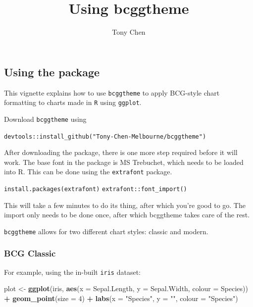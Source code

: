 \documentclass[
]{article}
\title{Using bcggtheme}
\author{Tony Chen}
\date{}
\newenvironment{Shaded}{\begin{snugshade}}{\end{snugshade}}
\newcommand{\DataTypeTok}[1]{\textcolor[rgb]{0.13,0.29,0.53}{#1}}
\newcommand{\DecValTok}[1]{\textcolor[rgb]{0.00,0.00,0.81}{#1}}
\newcommand{\KeywordTok}[1]{\textcolor[rgb]{0.13,0.29,0.53}{\textbf{#1}}}
\newcommand{\NormalTok}[1]{#1}
\newcommand{\OperatorTok}[1]{\textcolor[rgb]{0.81,0.36,0.00}{\textbf{#1}}}
\newcommand{\StringTok}[1]{\textcolor[rgb]{0.31,0.60,0.02}{#1}}
\begin{document}
\maketitle

\hypertarget{using-the-package}{%
\subsection{Using the package}\label{using-the-package}}

This vignette explains how to use \texttt{bcggtheme} to apply BCG-style
chart formatting to charts made in \texttt{R} using \texttt{ggplot}.

Download \texttt{bcggtheme} using

\texttt{devtools::install\_github("Tony-Chen-Melbourne/bcggtheme")}

After downloading the package, there is one more step required before it
will work. The base font in the package is MS Trebuchet, which needs to
be loaded into R. This can be done using the \texttt{extrafont} package.

\texttt{install.packages(extrafont)} \texttt{extrafont::font\_import()}

This will take a few minutes to do its thing, after which you're good to
go. The import only needs to be done once, after which bcggtheme takes
care of the rest.

\texttt{bcggtheme} allows for two different chart styles: classic and
modern.

\hypertarget{bcg-classic}{%
\subsubsection{BCG Classic}\label{bcg-classic}}

For example, using the in-built \texttt{iris} dataset:

\begin{Shaded}
\begin{Highlighting}[]
\NormalTok{plot <-}\StringTok{ }\KeywordTok{ggplot}\NormalTok{(iris,}
               \KeywordTok{aes}\NormalTok{(}\DataTypeTok{x =}\NormalTok{ Sepal.Length,}
                   \DataTypeTok{y =}\NormalTok{ Sepal.Width,}
                   \DataTypeTok{colour =}\NormalTok{ Species)) }\OperatorTok{+}
\StringTok{        }\KeywordTok{geom_point}\NormalTok{(}\DataTypeTok{size =} \DecValTok{4}\NormalTok{) }\OperatorTok{+}
\StringTok{        }\KeywordTok{labs}\NormalTok{(}\DataTypeTok{x =} \StringTok{"Species"}\NormalTok{,}
             \DataTypeTok{y =} \StringTok{""}\NormalTok{,}
             \DataTypeTok{colour =} \StringTok{"Species"}\NormalTok{)}
\end{Highlighting}
\end{Shaded}
\end{document}
